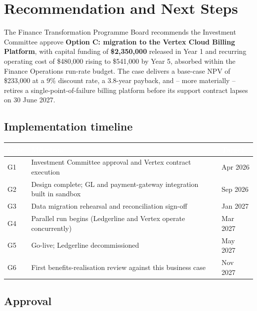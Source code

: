 \section{Recommendation and Next Steps}

\begin{tcolorbox}[recbox, title={\faFileContract\ Recommendation}]
The Finance Transformation Programme Board recommends the Investment Committee approve
\textbf{Option C: migration to the Vertex Cloud Billing Platform}, with capital funding of
\textbf{\$2,350,000} released in Year 1 and recurring operating cost of \$480,000 rising to
\$541,000 by Year 5, absorbed within the Finance Operations run-rate budget. The case delivers
a base-case NPV of \$233,000 at a 9\% discount rate, a 3.8-year payback, and -- more materially
-- retires a single-point-of-failure billing platform before its support contract lapses on
30 June 2027.
\end{tcolorbox}

\subsection{Implementation timeline}

\begin{center}
\footnotesize
\begin{tabularx}{\linewidth}{@{}l Y l@{}}
\toprule
{}
\textcolor{white}{\textbf{Gate}} & \textcolor{white}{\textbf{Milestone}} & \textcolor{white}{\textbf{Target}} \\
\midrule
G1 & Investment Committee approval and Vertex contract execution & Apr 2026 \\
G2 & Design complete; GL and payment-gateway integration built in sandbox & Sep 2026 \\
G3 & Data migration rehearsal and reconciliation sign-off & Jan 2027 \\
G4 & Parallel run begins (Ledgerline and Vertex operate concurrently) & Mar 2027 \\
G5 & Go-live; Ledgerline decommissioned & May 2027 \\
G6 & First benefits-realisation review against this business case & Nov 2027 \\
\bottomrule
\end{tabularx}
\end{center}

\subsection{Approval}

